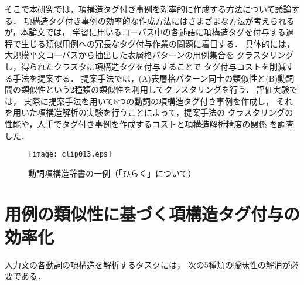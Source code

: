 そこで本研究では，項構造タグ付き事例を効率的に作成する方法について議論する．
項構造タグ付き事例の効率的な作成方法にはさまざまな方法が考えられるが，本論文では，
学習に用いるコーパス中の各述語に項構造タグを付与する過程で生じる類似用例への冗長なタグ付与作業の問題に着目する．
具体的には，
大規模平文コーパスから抽出した表層格パターンの用例集合を
クラスタリングし，得られたクラスタに項構造タグを付与することで
タグ付与コストを削減する手法を提案する．
提案手法では，(A)表層格パターン同士の類似性と(B)動詞間の類似性という2種類の類似性を利用してクラスタリングを行う．
評価実験では，
実際に提案手法を用いて8つの動詞の項構造タグ付き事例を作成し，
それを用いた項構造解析の実験を行うことによって，提案手法の
クラスタリングの性能や，人手でタグ付き事例を作成するコストと項構造解析精度の関係
を調査した．

\begin{figure}[t]
  \begin{center}
      \texttt{[image: clip013.eps]}
  \end{center}
  \caption{動詞項構造辞書の一例（「ひらく」について）}
  \label{fig:arg_dic}
\end{figure}


\section{用例の類似性に基づく項構造タグ付与の効率化}
\label{sec:third}

入力文の各動詞の項構造を解析するタスクには，
次の5種類の曖昧性の解消が必要である．

